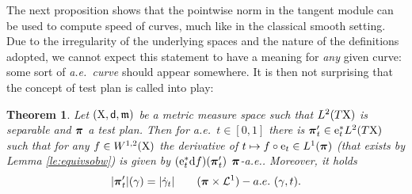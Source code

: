 \documentclass[11pt]{article}
\numberwithin{equation}{section}
\newtheorem{theorem}{Theorem}[section]
\newcommand{\ppi}{{\mbox{\boldmath$\pi$}}}
\newcommand{\e}{{\rm e}}
\newcommand{\X}{{\rm X}}
\newcommand{\sfd}{{\sf d}}
\newcommand{\mm}{{\mathfrak m}}
\renewcommand{\d}{{\rm d}}
\begin{document}
The next proposition shows that the pointwise norm in the tangent module can be used to compute speed of curves, much like in the classical smooth setting. Due to the irregularity of the underlying spaces and the nature of the definitions adopted, we cannot expect this statement to have a meaning for \emph{any} given curve: some sort of \emph{a.e.\ curve} should appear somewhere. It is then not surprising that the concept of test plan is called into play:    
\begin{theorem}\label{thm:speedplan}
Let $(\X,\sfd,\mm)$ be a metric measure space such that $L^2(T\X)$ is separable and $\ppi$ a test plan. Then for a.e.\ $t\in[0,1]$ there is $\ppi'_t\in \e_t^*L^2(T\X)$ such that for any $f\in W^{1,2}(\X)$ the derivative of $t\mapsto f\circ\e_t \in L^1(\ppi)$ (that exists by Lemma \ref{le:equivsobw}) is given by $(\e_t^*\d f)(\ppi'_t)$ $\ppi$-a.e..  Moreover, it holds
\begin{equation}
\label{eq:metsp}
|\ppi'_t|(\gamma)=|\dot\gamma_t|\qquad(\ppi\times\mathcal L^1)-a.e.\ (\gamma,t).
\end{equation}
\end{theorem}
\end{document}
